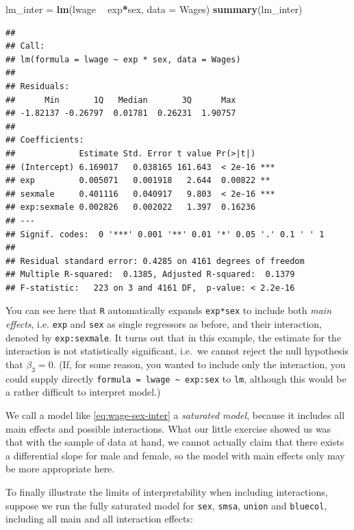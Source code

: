 \documentclass[]{book}
\newenvironment{Shaded}{\begin{snugshade}}{\end{snugshade}}
\newcommand{\KeywordTok}[1]{\textcolor[rgb]{0.13,0.29,0.53}{\textbf{#1}}}
\newcommand{\DataTypeTok}[1]{\textcolor[rgb]{0.13,0.29,0.53}{#1}}
\newcommand{\StringTok}[1]{\textcolor[rgb]{0.31,0.60,0.02}{#1}}
\newcommand{\OperatorTok}[1]{\textcolor[rgb]{0.81,0.36,0.00}{\textbf{#1}}}
\newcommand{\NormalTok}[1]{#1}
\theoremstyle{definition}
\theoremstyle{definition}
\theoremstyle{definition}
\theoremstyle{remark}
\begin{document}
\begin{Shaded}
\begin{Highlighting}[]
\NormalTok{lm_inter =}\StringTok{ }\KeywordTok{lm}\NormalTok{(lwage }\OperatorTok{~}\StringTok{ }\NormalTok{exp}\OperatorTok{*}\NormalTok{sex, }\DataTypeTok{data =}\NormalTok{ Wages)}
\KeywordTok{summary}\NormalTok{(lm_inter)}
\end{Highlighting}
\end{Shaded}

\begin{verbatim}
## 
## Call:
## lm(formula = lwage ~ exp * sex, data = Wages)
## 
## Residuals:
##      Min       1Q   Median       3Q      Max 
## -1.82137 -0.26797  0.01781  0.26231  1.90757 
## 
## Coefficients:
##             Estimate Std. Error t value Pr(>|t|)    
## (Intercept) 6.169017   0.038165 161.643  < 2e-16 ***
## exp         0.005071   0.001918   2.644  0.00822 ** 
## sexmale     0.401116   0.040917   9.803  < 2e-16 ***
## exp:sexmale 0.002826   0.002022   1.397  0.16236    
## ---
## Signif. codes:  0 '***' 0.001 '**' 0.01 '*' 0.05 '.' 0.1 ' ' 1
## 
## Residual standard error: 0.4285 on 4161 degrees of freedom
## Multiple R-squared:  0.1385, Adjusted R-squared:  0.1379 
## F-statistic:   223 on 3 and 4161 DF,  p-value: < 2.2e-16
\end{verbatim}

You can see here that \texttt{R} automatically expands \texttt{exp*sex}
to include both \emph{main effects}, i.e. \texttt{exp} and \texttt{sex}
as single regressors as before, and their interaction, denoted by
\texttt{exp:sexmale}. It turns out that in this example, the estimate
for the interaction is not statistically significant, i.e.~we cannot
reject the null hypothesis that \(\beta_3 = 0\). (If, for some reason,
you wanted to include only the interaction, you could supply directly
\texttt{formula\ =\ lwage\ \textasciitilde{}\ exp:sex} to \texttt{lm},
although this would be a rather difficult to interpret model.)

We call a model like \eqref{eq:wage-sex-inter} a \emph{saturated model},
because it includes all main effects and possible interactions. What our
little exercise showed us was that with the sample of data at hand, we
cannot actually claim that there exists a differential slope for male
and female, so the model with main effects only may be more appropriate
here.

To finally illustrate the limits of interpretability when including
interactions, suppose we run the fully saturated model for \texttt{sex},
\texttt{smsa}, \texttt{union} and \texttt{bluecol}, including all main
and all interaction effects:
\end{document}
